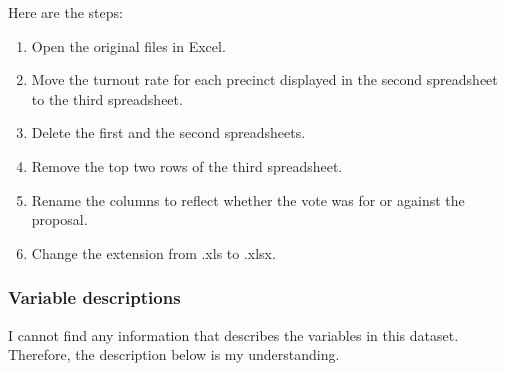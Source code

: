 \documentclass[
]{article}
\providecommand{\tightlist}{%
  \setlength{\itemsep}{0pt}\setlength{\parskip}{0pt}}
\begin{document}
Here are the steps:

\begin{enumerate}
\def\labelenumi{\arabic{enumi}.}
\tightlist
\item
  Open the original files in Excel.
\item
  Move the turnout rate for each precinct displayed in the second
  spreadsheet to the third spreadsheet.
\item
  Delete the first and the second spreadsheets.
\item
  Remove the top two rows of the third spreadsheet.
\item
  Rename the columns to reflect whether the vote was for or against the
  proposal.
\item
  Change the extension from .xls to .xlsx.
\end{enumerate}

\hypertarget{variable-descriptions}{%
\subsubsection{Variable descriptions}\label{variable-descriptions}}

I cannot find any information that describes the variables in this
dataset. Therefore, the description below is my understanding.
\end{document}
